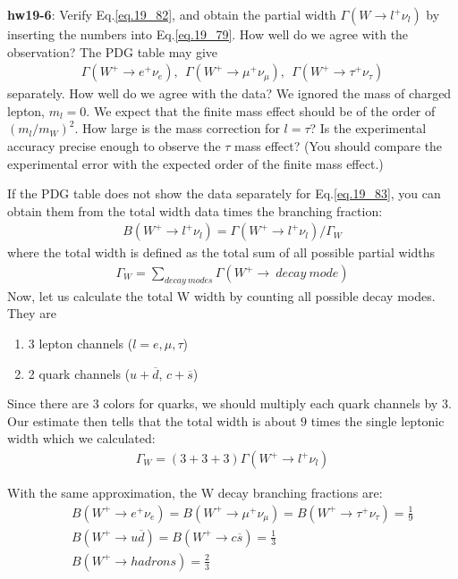 \documentclass[12pt]{article}
\begin{document}
{\bf hw19-6}: Verify Eq.\ref{eq.19_82}, and obtain the partial width $\Gamma(W \to  l^+ \nu_l)$ by inserting the numbers into Eq.\ref{eq.19_79}. How well do we agree with the observation? The PDG table may give
\begin{eqnarray}
  \Gamma(W^+ \to e^+ \nu_e),~~
  \Gamma(W^+ \to \mu^+ \nu_\mu),~~
  \Gamma(W^+ \to \tau^+ \nu_\tau) \label{eq.19_83}
\end{eqnarray}
separately.  How well do we agree with the data?  We ignored the mass
of charged lepton, $m_l = 0$.  We expect that the finite mass effect
should be of the order of $(m_l/m_W)^2$.  How large is the mass correction
for $l=\tau$? Is the experimental accuracy precise enough to observe
the $\tau$ mass effect? (You should compare the experimental error with
the expected order of the finite mass effect.)

If the PDG table does not show the data separately for Eq.\ref{eq.19_83},
you can obtain them from the total width data times the branching
fraction:
\begin{eqnarray}
  B(W^+ \to l^+ \nu_l) = \Gamma(W^+ \to l^+ \nu_l)/\Gamma_W \label{eq.19_84}
\end{eqnarray}
where the total width is defined as the total sum of all possible
partial widths
\begin{eqnarray}
  \Gamma_W = \sum_{decay~ modes} \Gamma(W^+ \to ~decay ~mode)\label{eq.19_85}
\end{eqnarray}
Now, let us calculate the total W width by counting all possible
decay modes.  They are
\begin{enumerate}
  \item 3 lepton channels ($l = e, \mu, \tau$)
  \item 2 quark channels ($u+{\overline d}$, $c+{\overline s}$)
\end{enumerate}

Since there are $3$ colors for quarks, we should multiply each quark
channels by $3$. Our estimate then tells that the total width is about
$9$ times the single leptonic width which we calculated:
\begin{eqnarray}
  \Gamma_W = (3 + 3 + 3) \Gamma(W^+ \to l^+ \nu_l) \label{eq.19_87}
\end{eqnarray}

With the same approximation, the W decay branching fractions are:
\begin{eqnarray}
  &&B(W^+ \to e^+ \nu_e) = B(W^+ \to \mu^+ \nu_\mu)
                        = B(W^+ \to \tau^+ \nu_\tau) = \frac{1}{9} \label{eq.19_88a}\\
  &&B(W^+ \to u {\overline d}) = B(W^+ \to c {\overline s}) = \frac{1}{3} \label{eq.19_88b}\\
  &&B(W^+ \to hadrons) = \frac{2}{3} \label{eq.19_88c}
\end{eqnarray}
\end{document}

